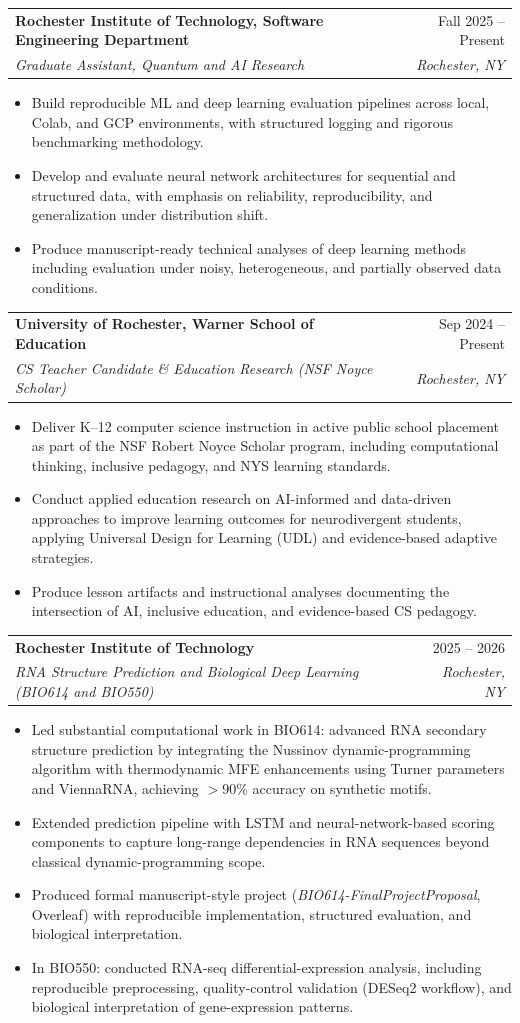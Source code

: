\documentclass[11pt]{article}
\makeatletter
\newcommand{\entry}[4]{
  \noindent\begin{tabularx}{\textwidth}{@{}Xr@{}}
    \textbf{#1} & #2 \\
    \textit{#3} & \textit{#4}
  \end{tabularx}\vspace{2pt}
}
\makeatother
\begin{document}
\entry{Rochester Institute of Technology, Software Engineering Department}{Fall 2025 -- Present}{Graduate Assistant, Quantum and AI Research}{Rochester, NY}
\begin{itemize}
  \item Build reproducible ML and deep learning evaluation pipelines across local, Colab, and GCP environments, with structured logging and rigorous benchmarking methodology.
  \item Develop and evaluate neural network architectures for sequential and structured data, with emphasis on reliability, reproducibility, and generalization under distribution shift.
  \item Produce manuscript-ready technical analyses of deep learning methods including evaluation under noisy, heterogeneous, and partially observed data conditions.
\end{itemize}

\entry{University of Rochester, Warner School of Education}{Sep 2024 -- Present}{CS Teacher Candidate \& Education Research (NSF Noyce Scholar)}{Rochester, NY}
\begin{itemize}
  \item Deliver K--12 computer science instruction in active public school placement as part of the NSF Robert Noyce Scholar program, including computational thinking, inclusive pedagogy, and NYS learning standards.
  \item Conduct applied education research on AI-informed and data-driven approaches to improve learning outcomes for neurodivergent students, applying Universal Design for Learning (UDL) and evidence-based adaptive strategies.
  \item Produce lesson artifacts and instructional analyses documenting the intersection of AI, inclusive education, and evidence-based CS pedagogy.
\end{itemize}

\entry{Rochester Institute of Technology}{2025 -- 2026}{RNA Structure Prediction and Biological Deep Learning (BIO614 and BIO550)}{Rochester, NY}
\begin{itemize}
  \item Led substantial computational work in BIO614: advanced RNA secondary structure prediction by integrating the Nussinov dynamic-programming algorithm with thermodynamic MFE enhancements using Turner parameters and ViennaRNA, achieving $>$90\% accuracy on synthetic motifs.
  \item Extended prediction pipeline with LSTM and neural-network-based scoring components to capture long-range dependencies in RNA sequences beyond classical dynamic-programming scope.
  \item Produced formal manuscript-style project (\textit{BIO614-FinalProjectProposal}, Overleaf) with reproducible implementation, structured evaluation, and biological interpretation.
  \item In BIO550: conducted RNA-seq differential-expression analysis, including reproducible preprocessing, quality-control validation (DESeq2 workflow), and biological interpretation of gene-expression patterns.
\end{itemize}
\end{document}
